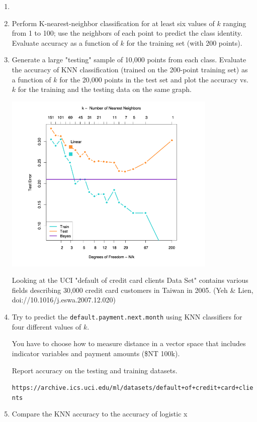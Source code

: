 \documentclass[12pt]{book}
\theoremstyle{definition}
\begin{document}
\begin{enumerate}
\item 

\item
Perform K-nearest-neighbor classification for at least six values of $k$ ranging from 1 to 100; use the neighbors of each point to predict the class identity.  Evaluate accuracy as a function of $k$ for the training set (with 200 points).

\item
Generate a large "testing" sample of 10,000 points from each class.
Evaluate the accuracy of KNN classification (trained on the 200-point training set)  as a function of $k$ for the 20,000 points in the test set and plot the accuracy vs. $k$ for the training and the testing data on the same graph.   

\includegraphics[width=4in]{src/hastie-generalization.png}

Looking at the UCI "default of credit card clients Data Set" contains various fields describing 30,000 credit card customers in Taiwan in 2005. (Yeh \& Lien,  doi://10.1016/j.eswa.2007.12.020)   

\item 
Try to predict the \texttt{default.payment.next.month} using KNN classifiers for four different values of $k$.

You have to choose how to measure distance in a vector space that includes indicator variables and payment amounts (\$NT 100k).  

Report accuracy on the testing and training datasets.

\texttt{https://archive.ics.uci.edu/ml/datasets/default+of+credit+card+clients}

\item
Compare the KNN accuracy to the accuracy of logistic x 
\end{enumerate}
\end{document}
